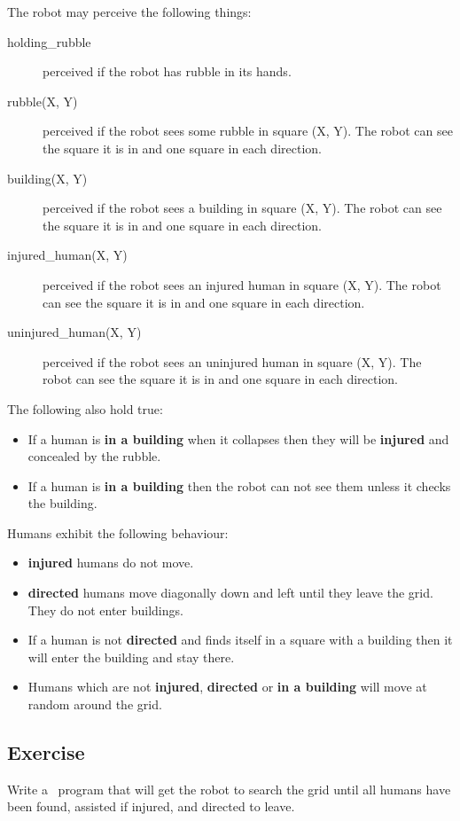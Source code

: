\documentclass[a4]{article}
\begin{document}
The robot may perceive the following things:
\begin{description}
\item[holding\_rubble] perceived if the robot has rubble in its hands.
\item[rubble(X, Y)] perceived if the robot sees some rubble in square (X, Y).  The robot can see the square it is in and one square in each direction.
\item[building(X, Y)] perceived if the robot sees a building in square (X, Y).  The robot can see the square it is in and one square in each direction.
\item[injured\_human(X, Y)] perceived if the robot sees an injured human in square (X, Y).  The robot can see the square it is in and one square in each direction.
\item[uninjured\_human(X, Y)] perceived if the robot sees an uninjured human in square (X, Y).  The robot can see the square it is in and one square in each direction.
\end{description}

The following also hold true:
\begin{itemize}
\item If a human is {\bf in a building} when it collapses then they will be {\bf injured} and concealed by the rubble.
\item If a human is {\bf in a building} then the robot can not see them unless it checks the building.
\end{itemize}

Humans exhibit the following behaviour:
\begin{itemize}
\item {\bf injured} humans do not move.
\item {\bf directed} humans move diagonally down and left until they leave the grid.  They do not enter buildings.
\item If a human is not {\bf directed} and finds itself in a square with a building then it will enter the building and stay there.
\item Humans which are not {\bf injured}, {\bf directed} or {\bf in a building} will move at random around the grid.
\end{itemize}

\subsection{Exercise}
Write a \gwendolen\ program that will get the robot to search the grid until all humans have been found, assisted if injured, and directed to leave.
\end{document}
